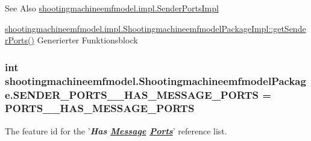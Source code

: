 \begin{DoxySeeAlso}{See Also}
\hyperlink{classshootingmachineemfmodel_1_1impl_1_1_sender_ports_impl}{shootingmachineemfmodel.\-impl.\-Sender\-Ports\-Impl} 

\hyperlink{classshootingmachineemfmodel_1_1impl_1_1_shootingmachineemfmodel_package_impl_a65cf0393c49f9556064a7d50a35b56a1}{shootingmachineemfmodel.\-impl.\-Shootingmachineemfmodel\-Package\-Impl\-::get\-Sender\-Ports()} Generierter Funktionsblock 
\end{DoxySeeAlso}
\hypertarget{interfaceshootingmachineemfmodel_1_1_shootingmachineemfmodel_package_a32f9aba86ce59940c62b442308c4bf7d}{
\subsubsection[{S\-E\-N\-D\-E\-R\-\_\-\-P\-O\-R\-T\-S\-\_\-\-\_\-\-H\-A\-S\-\_\-\-M\-E\-S\-S\-A\-G\-E\-\_\-\-P\-O\-R\-T\-S}]{\setlength{\rightskip}{0pt plus 5cm}int shootingmachineemfmodel.\-Shootingmachineemfmodel\-Package.\-S\-E\-N\-D\-E\-R\-\_\-\-P\-O\-R\-T\-S\-\_\-\-\_\-\-H\-A\-S\-\_\-\-M\-E\-S\-S\-A\-G\-E\-\_\-\-P\-O\-R\-T\-S = {\bf P\-O\-R\-T\-S\-\_\-\-\_\-\-H\-A\-S\-\_\-\-M\-E\-S\-S\-A\-G\-E\-\_\-\-P\-O\-R\-T\-S}}}\label{interfaceshootingmachineemfmodel_1_1_shootingmachineemfmodel_package_a32f9aba86ce59940c62b442308c4bf7d}
The feature id for the '{\itshape {\bfseries Has \hyperlink{interfaceshootingmachineemfmodel_1_1_message}{Message} \hyperlink{interfaceshootingmachineemfmodel_1_1_ports}{Ports}}}' reference list.

